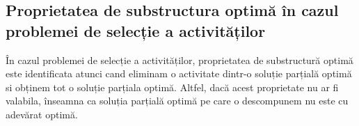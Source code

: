 \subsection{Proprietatea de substructura optimă în cazul problemei de selecție a activităților}
În cazul problemei de selecție a activităților, proprietatea de substructură optimă este identificata atunci cand eliminam o activitate dintr-o soluție parțială optimă si obținem tot o soluție parțiala optimă. Altfel, dacă acest proprietate nu ar fi valabila, înseamna ca soluția parțială optimă pe care o descompunem nu este cu adevărat optimă. 